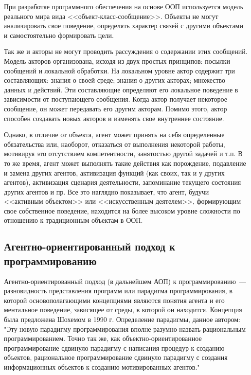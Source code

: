 При разработке программного обеспечения на основе ООП используется модель реального мира вида <<объект-класс-сообщение>>. Объекты не могут анализировать свое поведение, определять характер связей с другими объектами и самостоятельно формировать цели.

Так же и акторы не могут проводить рассуждения о содержании этих сообщений. Модель акторов организована, исходя из двух простых принципов: посылки сообщений и локальной обработки. На локальном уровне актор содержит три составляющих: знания о своей среде; знания о других акторах; множество данных и действий. Эти составляющие определяют его локальное поведение в зависимости от поступающего сообщения. Когда актор получает некоторое сообщение, он может передавать его другим акторам. Помимо этого, актор способен создавать новых акторов и изменять свое внутреннее состояние.

Однако, в отличие от объекта, агент может принять на себя определенные обязательства или, наоборот, отказаться от выполнения некоторой работы, мотивируя это отсутствием компетентности, занятостью другой задачей и т.п. В то же время, агент может выполнять такие действия как порождение, подавление и замена других агентов, активизация функций (как своих, так и у других агентов), активизация сценария деятельности, запоминание текущего состояния других агентов и пр. Все это наглядно показывает, что агент, будучи <<активным объектом>> или <<искусственным деятелем>>, формирующим свое собственное поведение, находится на более высоком уровне сложности по отношению к традиционным объектам в ООП.

\subsection{Агентно-ориентированный подход к программированию}
Агентно-ориентированный подход (в дальнейшем АОП) к программированию~---  разновидность представления программ или парадигма программирования, в которой основополагающими концепциями являются понятия агента и его ментальное поведение, зависящее от среды, в которой он находится. Концепция была предложена Шохемом в 1990 г. Определение парадигмы, данное автором:
"Эту новую парадигму программирования вполне разумно назвать рациональным программированием. Точно так же, как объектно-ориентированное программирование сдвинуло парадигму с написания процедур к созданию объектов, рациональное программирование сдвинуло парадигму с создания информационных объектов к созданию мотивированных агентов."

